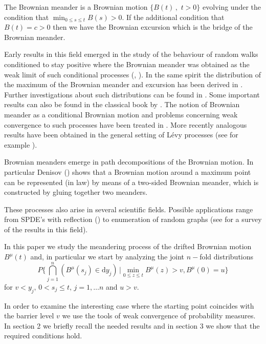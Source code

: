 The Brownian meander is a Brownian motion 
$\{B(t)\,,\,\, t>0\}$
evolving under the condition that $ \min_{0\leq s\leq t} B(s) > 0 $. 
If the additional condition that $ B(t) = c >0  $ then we have the Brownian excursion which 
is the bridge of the Brownian meander. 



Early results in this field emerged in the study of the behaviour of 
random walks conditioned to stay positive where the Brownian meander 
was obtained as the weak limit of such conditional processes (\cite{belkin70}, 
\cite{iglehart74}). In the same spirit the distribution of the maximum 
of the Brownian meander and excursion has been derived in \cite{kaigh78}. 
Further investigations about such distributions can be found in \cite{chung1976}. 
Some important results can also be found in the classical book by 
\citet{ito1996diffusion}. The notion 
of Brownian meander as a conditional Brownian motion and 
problems concerning weak convergence to such processes have been treated 
in \cite{durrett77}. 
More recently analogous results have been obtained in the general setting
of Lévy processes (see for example \cite{chaumont2005}). 

Brownian meanders emerge in path decompositions of the Brownian motion.
In particular Denisov (\cite{denisov84})  shows that a Brownian motion around a maximum 
point can be represented (in law) by means of a two-sided Brownian meander, which is constructed by gluing together 
two meanders. 

These processes also arise in several scientific fields. 
Possible applications range from SPDE's with reflection (\cite{zambotti04}) to enumeration of random graphs (see \cite{janson07} for a survey of the results in this field). 

In this paper we study the meandering process of the drifted Brownian motion $ B^\mu (t) $ and, 
in particular we start by analyzing the joint $ n- $fold distributions
\begin{equation}\label{eq:mdr-joint-intro}
P \bigg\{ \bigcap_{j=1}^n \left( B^\mu(s_j) \in \mathrm d y_j \right) \,\Big \vert \min_{0\leq z \leq t} B^\mu(z)> v , B^\mu(0)=u \bigg \} 
\end{equation}
%
for $ v < y_j,\,0< s_j \leq t,\, j= 1, \ldots n $ and $u>v $.

In order to examine the interesting case where the starting point coincides with the barrier level $ v $
we use the tools of weak convergence of probability measures. In section 2 we briefly recall the needed results and
in section 3 we show that the required conditions hold. 

